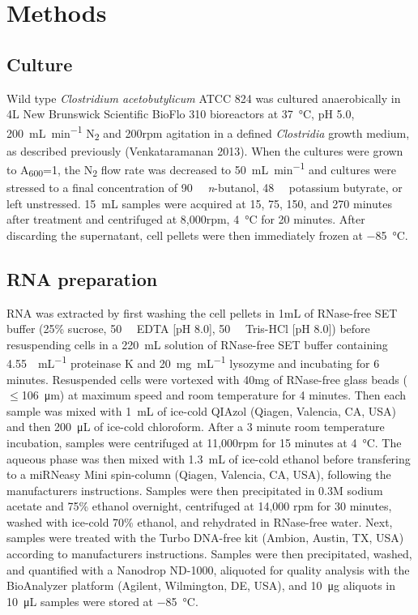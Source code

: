 
\chapter{Methods}


\section{Culture}
Wild type \textit{Clostridium acetobutylicum} ATCC 824 was cultured anaerobically in 4L New Brunswick Scientific BioFlo 310 bioreactors at \SI{37}{\degreeCelsius}, pH 5.0, \SI{200}{\milli\liter\per\minute} N\textsubscript{2} and 200rpm agitation in a defined \textit{Clostridia} growth medium, as described previously (Venkataramanan 2013). When the cultures were grown to A\textsubscript{600}=1, the N\textsubscript{2} flow rate was decreased to \SI{50}{\milli\liter\per\minute} and cultures were stressed to a final concentration of \SI{90}{\milli\Molar} \textit{n}-butanol, \SI{48}{\milli\Molar} potassium butyrate, or left unstressed. \SI{15}{\milli\liter} samples were acquired at 15, 75, 150, and 270 minutes after treatment and centrifuged at 8,000rpm, \SI{4}{\degreeCelsius} for 20 minutes. After discarding the supernatant, cell pellets were then immediately frozen at \SI{-85}{\degreeCelsius}.

\section{RNA preparation}
RNA was extracted by first washing the cell pellets in 1mL of RNase-free SET buffer (25\% sucrose, \SI{50}{\milli\Molar} EDTA [pH 8.0], \SI{50}{\milli\Molar} Tris-HCl [pH 8.0]) before resuspending cells in a \SI{220}{\milli\liter} solution of RNase-free SET buffer containing \SI{4.55}{\Units\per\milli\liter} proteinase K and \SI{20}{\milli\gram\per\milli\liter} lysozyme and incubating for 6 minutes. Resuspended cells were vortexed with 40mg of RNase-free glass beads ($\leq$\SI{106}{\micro\metre}) at maximum speed and room temperature for 4 minutes. Then each sample was mixed with \SI{1}{\milli\liter} of ice-cold QIAzol (Qiagen, Valencia, CA, USA) and then \SI{200}{\micro\liter} of ice-cold chloroform. After a 3 minute room temperature incubation, samples were centrifuged at 11,000rpm for 15 minutes at \SI{4}{\degreeCelsius}. The aqueous phase was then mixed with \SI{1.3}{\milli\liter} of ice-cold ethanol before transfering to a miRNeasy Mini spin-column (Qiagen, Valencia, CA, USA), following the manufacturers instructions. Samples were then precipitated in 0.3M sodium acetate and 75\% ethanol overnight, centrifuged at 14,000 rpm for 30 minutes, washed with ice-cold 70\% ethanol, and rehydrated in RNase-free water. Next, samples were treated with the Turbo DNA-free kit (Ambion, Austin, TX, USA) according to manufacturers instructions. Samples were then precipitated, washed, and quantified with a Nanodrop ND-1000, aliquoted for quality analysis with the BioAnalyzer platform (Agilent, Wilmington, DE, USA), and \SI{10}{\micro\gram} aliquots in \SI{10}{\micro\liter} samples were stored at \SI{-85}{\degreeCelsius}.
